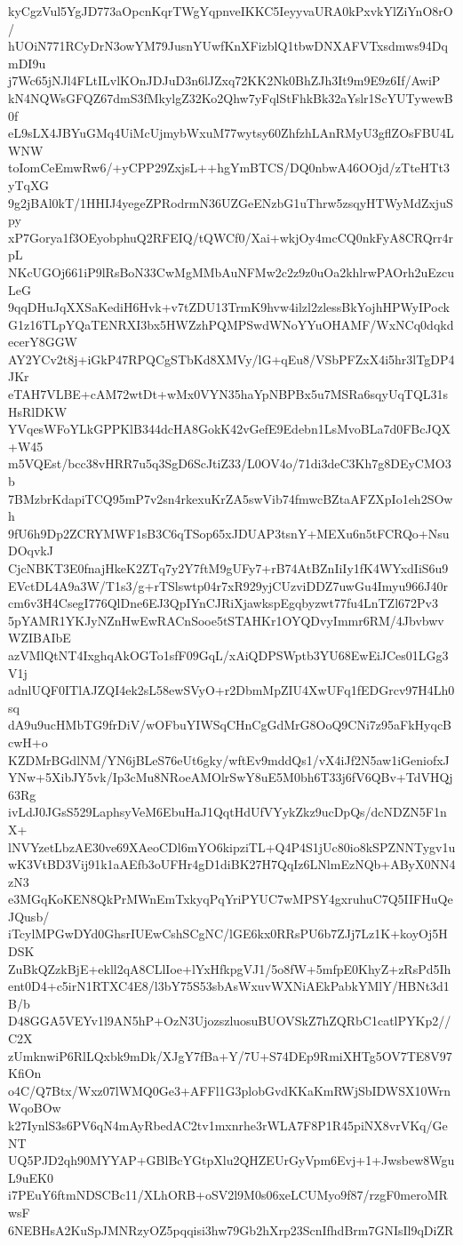 kyCgzVul5YgJD773aOpcnKqrTWgYqpnveIKKC5IeyyvaURA0kPxvkYlZiYnO8rO/
hUOiN771RCyDrN3owYM79JusnYUwfKnXFizblQ1tbwDNXAFVTxsdmws94DqmDI9u
j7Wc65jNJl4FLtILvlKOnJDJuD3n6lJZxq72KK2Nk0BhZJh3It9m9E9z6If/AwiP
kN4NQWsGFQZ67dmS3fMkylgZ32Ko2Qhw7yFqlStFhkBk32aYslr1ScYUTywewB0f
eL9sLX4JBYuGMq4UiMcUjmybWxuM77wytsy60ZhfzhLAnRMyU3gflZOsFBU4LWNW
toIomCeEmwRw6/+yCPP29ZxjsL++hgYmBTCS/DQ0nbwA46OOjd/zTteHTt3yTqXG
9g2jBAl0kT/1HHIJ4yegeZPRodrmN36UZGeENzbG1uThrw5zsqyHTWyMdZxjuSpy
xP7Gorya1f3OEyobphuQ2RFEIQ/tQWCf0/Xai+wkjOy4mcCQ0nkFyA8CRQrr4rpL
NKcUGOj661iP9lRsBoN33CwMgMMbAuNFMw2c2z9z0uOa2khlrwPAOrh2uEzcuLeG
9qqDHuJqXXSaKediH6Hvk+v7tZDU13TrmK9hvw4ilzl2zlessBkYojhHPWyIPock
G1z16TLpYQaTENRXI3bx5HWZzhPQMPSwdWNoYYuOHAMF/WxNCq0dqkdecerY8GGW
AY2YCv2t8j+iGkP47RPQCgSTbKd8XMVy/lG+qEu8/VSbPFZxX4i5hr3lTgDP4JKr
eTAH7VLBE+cAM72wtDt+wMx0VYN35haYpNBPBx5u7MSRa6sqyUqTQL31sHsRlDKW
YVqesWFoYLkGPPKlB344dcHA8GokK42vGefE9Edebn1LsMvoBLa7d0FBcJQX+W45
m5VQEst/bcc38vHRR7u5q3SgD6ScJtiZ33/L0OV4o/71di3deC3Kh7g8DEyCMO3b
7BMzbrKdapiTCQ95mP7v2sn4rkexuKrZA5swVib74fmwcBZtaAFZXpIo1eh2SOwh
9fU6h9Dp2ZCRYMWF1sB3C6qTSop65xJDUAP3tsnY+MEXu6n5tFCRQo+NsuDOqvkJ
CjcNBKT3E0fnajHkeK2ZTq7y2Y7ftM9gUFy7+rB74AtBZnIiIy1fK4WYxdIiS6u9
EVctDL4A9a3W/T1s3/g+rTSlswtp04r7xR929yjCUzviDDZ7uwGu4Imyu966J40r
cm6v3H4CsegI776QlDne6EJ3QpIYnCJRiXjawkspEgqbyzwt77fu4LnTZl672Pv3
5pYAMR1YKJyNZnHwEwRACnSooe5tSTAHKr1OYQDvyImmr6RM/4JbvbwvWZIBAIbE
azVMlQtNT4IxghqAkOGTo1sfF09GqL/xAiQDPSWptb3YU68EwEiJCes01LGg3V1j
adnlUQF0ITlAJZQI4ek2sL58ewSVyO+r2DbmMpZIU4XwUFq1fEDGrcv97H4Lh0sq
dA9u9ucHMbTG9frDiV/wOFbuYIWSqCHnCgGdMrG8OoQ9CNi7z95aFkHyqcBcwH+o
KZDMrBGdlNM/YN6jBLeS76eUt6gky/wftEv9mddQs1/vX4iJf2N5aw1iGeniofxJ
YNw+5XibJY5vk/Ip3cMu8NRoeAMOlrSwY8uE5M0bh6T33j6fV6QBv+TdVHQj63Rg
ivLdJ0JGsS529LaphsyVeM6EbuHaJ1QqtHdUfVYykZkz9ucDpQs/dcNDZN5F1nX+
lNVYzetLbzAE30ve69XAeoCDl6mYO6kipziTL+Q4P4S1jUc80io8kSPZNNTygv1u
wK3VtBD3Vij91k1aAEfb3oUFHr4gD1diBK27H7QqIz6LNlmEzNQb+AByX0NN4zN3
e3MGqKoKEN8QkPrMWnEmTxkyqPqYriPYUC7wMPSY4gxruhuC7Q5IIFHuQeJQusb/
iTcylMPGwDYd0GhsrIUEwCshSCgNC/lGE6kx0RRsPU6b7ZJj7Lz1K+koyOj5HDSK
ZuBkQZzkBjE+ekll2qA8CLlIoe+lYxHfkpgVJ1/5o8fW+5mfpE0KhyZ+zRsPd5Ih
ent0D4+c5irN1RTXC4E8/l3bY75S53sbAsWxuvWXNiAEkPabkYMlY/HBNt3d1B/b
D48GGA5VEYv1l9AN5hP+OzN3UjozszluosuBUOVSkZ7hZQRbC1catlPYKp2//C2X
zUmknwiP6RlLQxbk9mDk/XJgY7fBa+Y/7U+S74DEp9RmiXHTg5OV7TE8V97KfiOn
o4C/Q7Btx/Wxz07lWMQ0Ge3+AFFl1G3plobGvdKKaKmRWjSbIDWSX10WrnWqoBOw
k27IynlS3s6PV6qN4mAyRbedAC2tv1mxnrhe3rWLA7F8P1R45piNX8vrVKq/GeNT
UQ5PJD2qh90MYYAP+GBlBcYGtpXlu2QHZEUrGyVpm6Evj+1+Jwsbew8WguL9uEK0
i7PEuY6ftmNDSCBc11/XLhORB+oSV2l9M0s06xeLCUMyo9f87/rzgF0meroMRwsF
6NEBHsA2KuSpJMNRzyOZ5pqqisi3hw79Gb2hXrp23ScnIfhdBrm7GNIsIl9qDiZR
